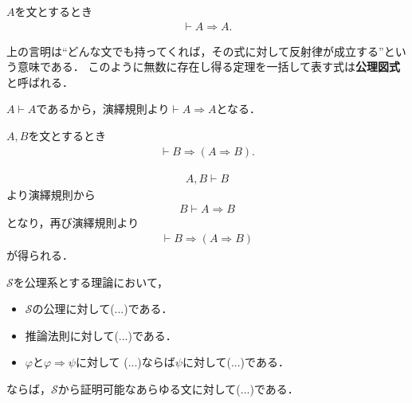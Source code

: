 	\begin{screen}
		\begin{logicalthm}[含意の反射律]\label{logicalthm:reflective_law_of_implication}
			$A$を文とするとき
			\begin{align}
				\vdash A \Longrightarrow A.
			\end{align}
		\end{logicalthm}
	\end{screen}
	
	上の言明は``どんな文でも持ってくれば，その式に対して反射律が成立する''という意味である．
	このように無数に存在し得る定理を一括して表す式は{\bf 公理図式}と呼ばれる．
	
	\begin{prf}
		$A \vdash A$であるから，演繹規則より$\vdash A \Longrightarrow A$となる．
		\QED
	\end{prf}
	
	\begin{screen}
		\begin{logicalthm}[正しい式は仮定を選ばない]\label{logicalthm:rule_of_inference_2}
			$A,B$を文とするとき
			\begin{align}
				\vdash B \Longrightarrow (A \Longrightarrow B).
			\end{align}
		\end{logicalthm}
	\end{screen}
	
	\begin{prf}
		\begin{align}
			A,B \vdash B
		\end{align}
		より演繹規則から
		\begin{align}
			B \vdash A \Longrightarrow B
		\end{align}
		となり，再び演繹規則より
		\begin{align}
			\vdash B \Longrightarrow (A \Longrightarrow B)
		\end{align}
		が得られる．
		\QED
	\end{prf}
	
	\begin{screen}
		\begin{metaaxm}[証明に対する構造的帰納法]
			$\mathscr{S}$を公理系とする理論において，
			\begin{itemize}
				\item $\mathscr{S}$の公理に対して(...)である．
				\item 推論法則に対して(...)である．
				\item $\varphi$と$\varphi \Longrightarrow \psi$に対して
					(...)ならば$\psi$に対して(...)である．
			\end{itemize}
			ならば，$\mathscr{S}$から証明可能なあらゆる文に対して(...)である．
		\end{metaaxm}
	\end{screen}
	
